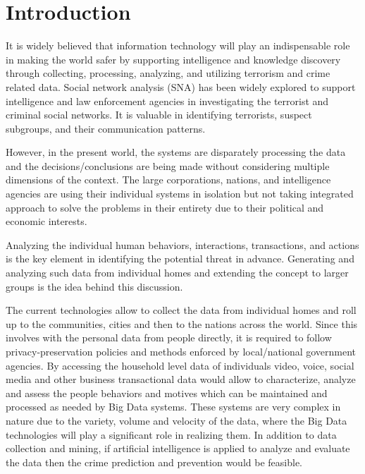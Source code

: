 \documentclass[sigconf]{acmart}
\begin{document}

\maketitle

\section{Introduction}
It is widely believed that information technology will play an indispensable role in making the world safer by supporting intelligence and knowledge discovery through collecting, processing, analyzing, and utilizing terrorism and crime related data\cite{Kantor2005}. Social network analysis (SNA) has been widely explored to support intelligence and law enforcement agencies in investigating the terrorist and criminal social networks. It is valuable in identifying terrorists, suspect subgroups, and their communication patterns.

However, in the present world, the systems are disparately processing the data and the decisions/conclusions are being made without considering multiple dimensions of the context. The large corporations, nations, and intelligence agencies are using their individual systems in isolation but not taking integrated approach to solve the problems in their entirety due to their political and economic interests.

Analyzing the individual human behaviors, interactions, transactions, and actions is the key element in identifying the potential threat in advance. Generating and analyzing such data from individual homes and extending the concept to larger groups is the idea behind this discussion.

The current technologies allow to collect the data from individual homes and roll up to the communities, cities and then to the nations across the world. Since this involves with the personal data from people directly, it is required to follow privacy-preservation policies and methods enforced by local/national government agencies. By accessing the household level data of individuals video, voice, social media and other business transactional data would allow to characterize, analyze and assess the people behaviors and motives which can be maintained and processed as needed by Big Data systems. These systems are very complex in nature due to the variety, volume and velocity of the data, where the Big Data technologies will play a significant role in realizing them. In addition to data collection and mining, if artificial intelligence is applied to analyze and evaluate the data then the crime prediction and prevention would be feasible.
\end{document}
